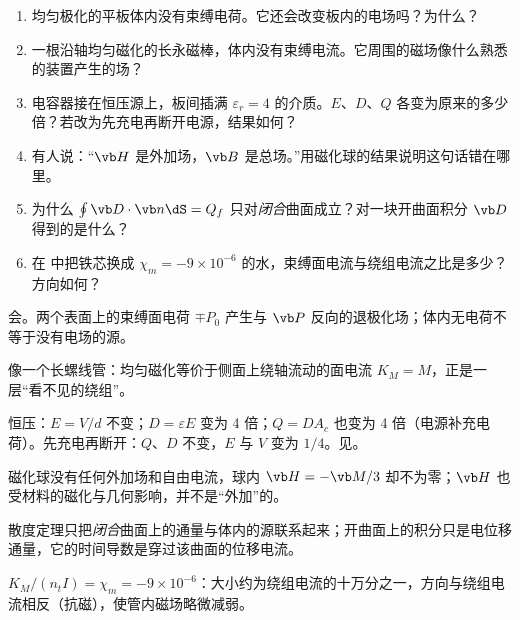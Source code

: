\begin{selfcheck}
\begin{enumerate}
\item 均匀极化的平板体内没有束缚电荷。它还会改变板内的电场吗？为什么？
\item 一根沿轴均匀磁化的长永磁棒，体内没有束缚电流。它周围的磁场像什么熟悉的装置产生的场？
\item 电容器接在恒压源上，板间插满 $\varepsilon_r=4$ 的介质。$E$、$D$、$Q$ 各变为原来的多少倍？若改为先充电再断开电源，结果如何？
\item 有人说：“$\vb H$ 是外加场，$\vb B$ 是总场。”用磁化球的结果说明这句话错在哪里。
\item 为什么 $\oint\vb D\cdot\vb n\dS=Q_f$ 只对\emph{闭合}曲面成立？对一块开曲面积分 $\vb D$ 得到的是什么？
\item 在 中把铁芯换成 $\chi_m=-9\times10^{-6}$ 的水\cite{griffiths}，束缚面电流与绕组电流之比是多少？方向如何？
\end{enumerate}
\end{selfcheck}

\begin{answers}
\item 会。两个表面上的束缚面电荷 $\mp P_0$ 产生与 $\vb P$ 反向的退极化场；体内无电荷不等于没有电场的源。
\item 像一个长螺线管：均匀磁化等价于侧面上绕轴流动的面电流 $K_M=M$，正是一层“看不见的绕组”。
\item 恒压：$E=V/d$ 不变；$D=\varepsilon E$ 变为 4 倍；$Q=DA_c$ 也变为 4 倍（电源补充电荷）。先充电再断开：$Q$、$D$ 不变，$E$ 与 $V$ 变为 $1/4$。见。
\item 磁化球没有任何外加场和自由电流，球内 $\vb H=-\vb M/3$ 却不为零；$\vb H$ 也受材料的磁化与几何影响，并不是“外加”的。
\item 散度定理只把\emph{闭合}曲面上的通量与体内的源联系起来；开曲面上的积分只是电位移通量，它的时间导数是穿过该曲面的位移电流。
\item $K_M/(n_tI)=\chi_m=-9\times10^{-6}$：大小约为绕组电流的十万分之一，方向与绕组电流相反（抗磁），使管内磁场略微减弱。
\end{answers}

